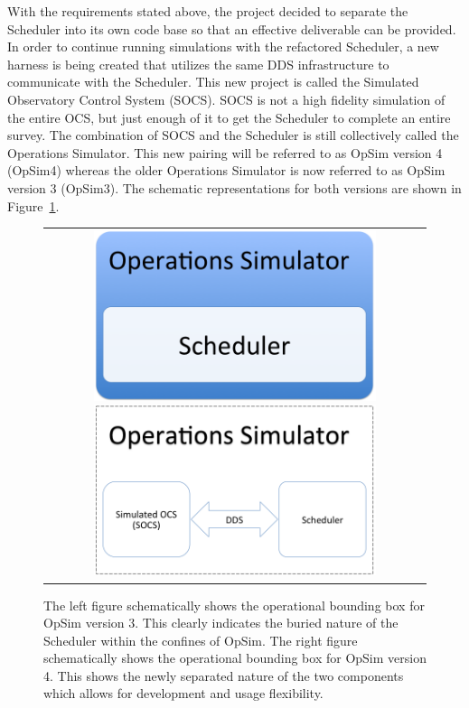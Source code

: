 \documentclass[]{spie}  %
\begin{document}
With the requirements stated above, the project decided to separate the Scheduler\cite{Delgado_SPIE2016} into its own code base so that an effective deliverable can be provided.  In order to continue running simulations with the refactored Scheduler, a new harness is being created that utilizes the same DDS infrastructure to communicate with the Scheduler. This new project is called the Simulated Observatory Control System (SOCS). SOCS is not a high fidelity simulation of the entire OCS, but just enough of it to get the Scheduler to complete an entire survey. The combination of SOCS and the Scheduler is still collectively called the Operations Simulator. This new pairing will be referred to as OpSim version 4 (OpSim4) whereas the older Operations Simulator is now referred to as OpSim version 3 (OpSim3). The schematic representations for both versions are shown in Figure~\ref{fig:opsim}.

\begin{figure} [ht]
  	\begin{center}
  		\begin{tabular}{c} 
  			\includegraphics[height=5cm]{Opsimv3.png}
  			\includegraphics[height=5cm]{Opsimv4.png}
  		\end{tabular}
  	\end{center}
  	\caption[What is this?] 
  	{ \label{fig:opsim} 
  		The left figure schematically shows the operational bounding box for OpSim version 3. This clearly indicates the buried nature of the Scheduler within the confines of OpSim. The right figure schematically shows the operational bounding box for OpSim version 4. This shows the newly separated nature of the two components which allows for development and usage flexibility.}
\end{figure} 
\end{document}
